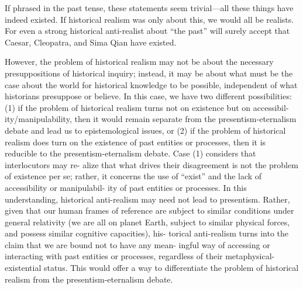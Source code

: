 

%


If phrased in the past tense, these statements
seem trivial—all these things have indeed existed. If historical realism was only
about this, we would all be realists. For even a strong historical anti-realist about
“the past” will surely accept that Caesar, Cleopatra, and Sima Qian have existed.

However, the problem of historical realism may not be about the necessary
presuppositions of historical inquiry; instead, it may be about what must be the
case about the world for historical knowledge to be possible, independent of what
historians presuppose or believe. In this case, we have two different possibilities:
(1) if the problem of historical realism turns not on existence but on accessibil-
ity/manipulability, then it would remain separate from the presentism-eternalism
debate and lead us to epistemological issues, or (2) if the problem of historical
realism does turn on the existence of past entities or processes, then it is reducible
to the presentism-eternalism debate. Case (1) considers that interlocutors may re-
alize that what drives their disagreement is not the problem of existence per se;
rather, it concerns the use of “exist” and the lack of accessibility or manipulabil-
ity of past entities or processes. In this understanding, historical anti-realism may
need not lead to presentism. Rather, given that our human frames of reference are
subject to similar conditions under general relativity (we are all on planet Earth,
subject to similar physical forces, and possess similar cognitive capacities), his-
torical anti-realism turns into the claim that we are bound not to have any mean-
ingful way of accessing or interacting with past entities or processes, regardless
of their metaphysical-existential status. This would offer a way to differentiate the
problem of historical realism from the presentism-eternalism debate.

